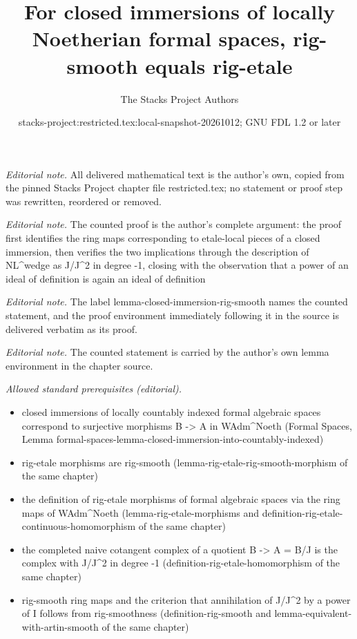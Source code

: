 \documentclass[10pt,a4paper]{amsart}
\title{For closed immersions of locally Noetherian formal spaces, rig-smooth equals rig-etale}
\author{The Stacks Project Authors}
\date{stacks-project:restricted.tex:local-snapshot-20261012; GNU FDL 1.2 or later}
\theoremstyle{plain}
\theoremstyle{definition}
\theoremstyle{remark}
\numberwithin{equation}{subsection}
\begin{document}
\maketitle
\noindent\textit{Editorial note.} All delivered mathematical text is the author's own, copied from the pinned Stacks Project chapter file restricted.tex; no statement or proof step was rewritten, reordered or removed.\par\medskip
\noindent\textit{Editorial note.} The counted proof is the author's complete argument: the proof first identifies the ring maps corresponding to etale-local pieces of a closed immersion, then verifies the two implications through the description of NL\textasciicircum{}wedge as J/J\textasciicircum{}2 in degree -1, closing with the observation that a power of an ideal of definition is again an ideal of definition\par\medskip
\noindent\textit{Editorial note.} The label lemma-closed-immersion-rig-smooth names the counted statement, and the proof environment immediately following it in the source is delivered verbatim as its proof.\par\medskip
\noindent\textit{Editorial note.} The counted statement is carried by the author's own lemma environment in the chapter source.\par\medskip
\noindent\textit{Allowed standard prerequisites (editorial).}\begin{itemize}
\item closed immersions of locally countably indexed formal algebraic spaces correspond to surjective morphisms B -> A in WAdm\textasciicircum{}Noeth (Formal Spaces, Lemma formal-spaces-lemma-closed-immersion-into-countably-indexed)
\item rig-etale morphisms are rig-smooth (lemma-rig-etale-rig-smooth-morphism of the same chapter)
\item the definition of rig-etale morphisms of formal algebraic spaces via the ring maps of WAdm\textasciicircum{}Noeth (lemma-rig-etale-morphisms and definition-rig-etale-continuous-homomorphism of the same chapter)
\item the completed naive cotangent complex of a quotient B -> A = B/J is the complex with J/J\textasciicircum{}2 in degree -1 (definition-rig-etale-homomorphism of the same chapter)
\item rig-smooth ring maps and the criterion that annihilation of J/J\textasciicircum{}2 by a power of I follows from rig-smoothness (definition-rig-smooth and lemma-equivalent-with-artin-smooth of the same chapter)
\end{itemize}\medskip
\end{document}
